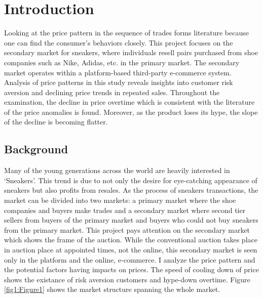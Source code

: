 \documentclass[a4paper]{article}
\theoremstyle{definition}
\theoremstyle{definition}
\theoremstyle{remark}
\begin{document}
\begin{large}
	\setcounter{page}{1}
	{ \hypersetup{hidelinks} \tableofcontents }

\newpage

\section{Introduction}

Looking at the price pattern in the sequence of trades forms literature because one can find the consumer's behaviors closely. This project focuses on the secondary market for sneakers, where individuals resell pairs purchased from shoe companies such as Nike, Adidas, etc. in the primary market. The secondary market operates within a platform-based third-party e-commerce system. Analysis of price patterns in this study reveals insights into customer risk aversion and declining price trends in repeated sales. Throughout the examination, the decline in price overtime which is consistent with the literature of the price anomalies is found. Moreover, as the product loses its hype, the slope of the decline is becoming flatter.

\subsection{Background}

Many of the young generations across the world are heavily interested in `Sneakers'. This trend is due to not only the desire for eye-catching appearance of sneakers but also profits from resales. As the process of sneakers transactions, the market can be divided into two markets: a primary market where the shoe companies and buyers make trades and a secondary market where second tier sellers from buyers of the primary market and buyers who could not buy sneakers from the primary market. This project pays attention on the secondary market which shows the frame of the auction. While the conventional auction takes place in auction place at appointed times, not the online, this secondary market is seen only in the platform and the online, e-commerce. I analyze the price pattern and the potential factors having impacts on prices. The speed of cooling down of price shows the existance of risk aversion customers and hype-down overtime. Figure \ref{fig1:Figure1} shows the market structure spanning the whole market.

\vspace{1cm}


\end{large}
\end{document}
